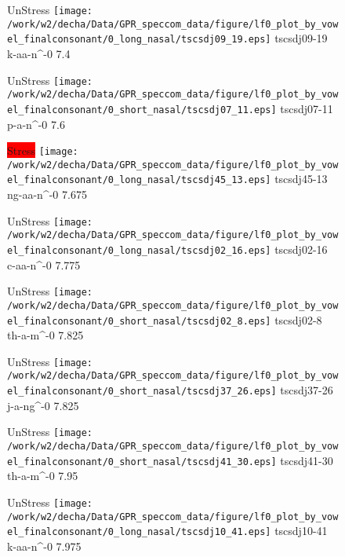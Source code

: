 \documentclass{article}
\begin{document}
\begin{figure}[t]
\begin{minipage}[b]{.24\textwidth}
UnStress
\centering
\texttt{[image: /work/w2/decha/Data/GPR\_speccom\_data/figure/lf0\_plot\_by\_vowel\_finalconsonant/0\_long\_nasal/tscsdj09\_19.eps]}
tscsdj09-19 k-aa-n\textasciicircum-0 7.4
\end{minipage}
\begin{minipage}[b]{.24\textwidth}
UnStress
\centering
\texttt{[image: /work/w2/decha/Data/GPR\_speccom\_data/figure/lf0\_plot\_by\_vowel\_finalconsonant/0\_short\_nasal/tscsdj07\_11.eps]}
tscsdj07-11 p-a-n\textasciicircum-0 7.6
\end{minipage}
\begin{minipage}[b]{.24\textwidth}
\colorbox{red}{Stress}
\centering
\texttt{[image: /work/w2/decha/Data/GPR\_speccom\_data/figure/lf0\_plot\_by\_vowel\_finalconsonant/0\_long\_nasal/tscsdj45\_13.eps]}
tscsdj45-13 ng-aa-n\textasciicircum-0 7.675
\end{minipage}
\begin{minipage}[b]{.24\textwidth}
UnStress
\centering
\texttt{[image: /work/w2/decha/Data/GPR\_speccom\_data/figure/lf0\_plot\_by\_vowel\_finalconsonant/0\_long\_nasal/tscsdj02\_16.eps]}
tscsdj02-16 c-aa-n\textasciicircum-0 7.775
\end{minipage}
\end{figure}
\clearpage
\begin{figure}[t]
\begin{minipage}[b]{.24\textwidth}
UnStress
\centering
\texttt{[image: /work/w2/decha/Data/GPR\_speccom\_data/figure/lf0\_plot\_by\_vowel\_finalconsonant/0\_short\_nasal/tscsdj02\_8.eps]}
tscsdj02-8 th-a-m\textasciicircum-0 7.825
\end{minipage}
\begin{minipage}[b]{.24\textwidth}
UnStress
\centering
\texttt{[image: /work/w2/decha/Data/GPR\_speccom\_data/figure/lf0\_plot\_by\_vowel\_finalconsonant/0\_short\_nasal/tscsdj37\_26.eps]}
tscsdj37-26 j-a-ng\textasciicircum-0 7.825
\end{minipage}
\begin{minipage}[b]{.24\textwidth}
UnStress
\centering
\texttt{[image: /work/w2/decha/Data/GPR\_speccom\_data/figure/lf0\_plot\_by\_vowel\_finalconsonant/0\_short\_nasal/tscsdj41\_30.eps]}
tscsdj41-30 th-a-m\textasciicircum-0 7.95
\end{minipage}
\begin{minipage}[b]{.24\textwidth}
UnStress
\centering
\texttt{[image: /work/w2/decha/Data/GPR\_speccom\_data/figure/lf0\_plot\_by\_vowel\_finalconsonant/0\_long\_nasal/tscsdj10\_41.eps]}
tscsdj10-41 k-aa-n\textasciicircum-0 7.975
\end{minipage}
\end{figure}
\end{document}
